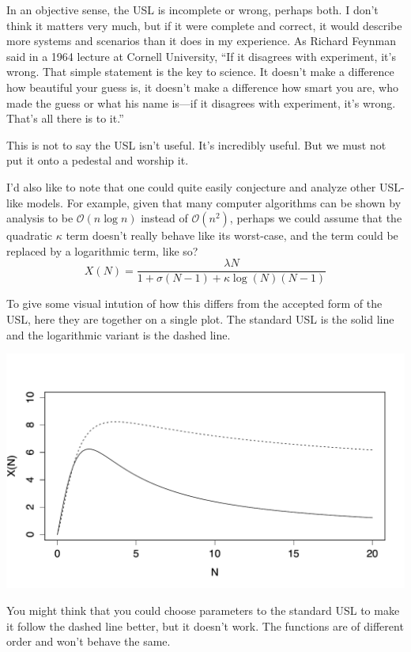 \documentclass{vivid_layout}
\begin{document}
In an objective sense, the USL is incomplete or wrong, perhaps both. I don't
think it matters very much, but if it were complete and correct, it would
describe more systems and scenarios than it does in my experience. As Richard
Feynman said in a 1964 lecture at Cornell University, ``If it disagrees with
experiment, it’s wrong.  That simple statement is the key to science. It
doesn’t make a difference how beautiful your guess is, it doesn’t make a
difference how smart you are, who made the guess or what his name is---if it
disagrees with experiment, it’s wrong. That’s all there is to it.''

This is not to say the USL isn't useful. It's incredibly useful. But we must not
put it onto a pedestal and worship it.

I'd also like to note that one could quite easily conjecture and analyze other
USL-like models. For example, given that many computer algorithms can be shown
by analysis to be $\mathcal{O}(n\log{}n)$ instead of $\mathcal{O}(n^2)$, perhaps
we could assume that the quadratic $\kappa$ term doesn't really behave like its
worst-case, and the term could be replaced by a logarithmic term, like so?
\[
X(N) = \frac{\lambda N}{1 + \sigma(N-1) + \kappa \log(N)(N-1)}
\]

To give some visual intution of how this differs from the accepted form of the
USL, here they are together on a single plot. The standard USL is the solid line
and the logarithmic variant is the dashed line.
\begin{center}
\includegraphics[width=.85\linewidth]{scalability/logscale}
\end{center}

You might think that you could choose parameters to the standard USL to make it
follow the dashed line better, but it doesn't work. The functions are of
different order and won't behave the same.
\end{document}
